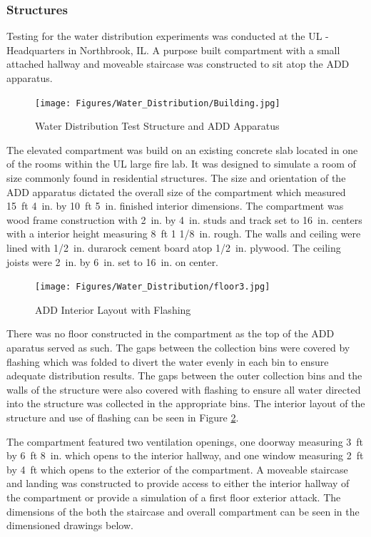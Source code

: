 \documentclass{article}
\begin{document}
\subsubsection{Structures}

Testing for the water distribution experiments was conducted at the UL - Headquarters in Northbrook, IL. A purpose built compartment with a small attached hallway and moveable staircase was constructed to sit atop the ADD apparatus.

\begin{figure}[!ht]
	\centering
	\texttt{[image: Figures/Water\_Distribution/Building.jpg]}
	\caption{Water Distribution Test Structure and ADD Apparatus}
	\label{fig:Water_Distribution_Test_Structure_and_ADD_Apparatus}
\end{figure}

The elevated compartment was build on an existing concrete slab located in one of the rooms within the UL large fire lab. It was designed to simulate a room of size commonly found in residential structures. The size and orientation of the ADD apparatus dictated the overall size of the compartment which measured 15~ft 4~in. by 10~ft 5~in. finished interior dimensions. The compartment was wood frame construction with 2~in. by 4~in. studs and track set to 16~in. centers with a interior height measuring 8~ft 1 1/8~in. rough. The walls and ceiling were lined with 1/2~in. durarock cement board atop 1/2~in. plywood. The ceiling joists were 2~in. by 6~in. set to 16~in. on center. 

\clearpage

\begin{figure}[!ht]
	\centering
	\texttt{[image: Figures/Water\_Distribution/floor3.jpg]}
	\caption{ADD Interior Layout with Flashing}
	\label{fig:ADD_Flashing}
\end{figure}

There was no floor constructed in the compartment as the top of the ADD aparatus served as such. The gaps between the collection bins were covered by flashing which was folded to divert the water evenly in each bin to ensure adequate distribution results. The gaps between the outer collection bins and the walls of the structure were also covered with flashing to ensure all water directed into the structure was collected in the appropriate bins. The interior layout of the structure and use of flashing can be seen in Figure \ref{fig:ADD_Flashing}. 

The compartment featured two ventilation openings, one doorway measuring 3~ft by 6~ft 8~in. which opens to the interior hallway, and one window measuring 2~ft by 4~ft which opens to the exterior of the compartment. A moveable staircase and landing was constructed to provide access to either the interior hallway of the compartment or provide a simulation of a first floor exterior attack. The dimensions of the both the staircase and overall compartment can be seen in the dimensioned drawings below.
\end{document}
